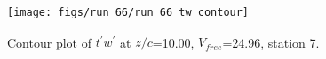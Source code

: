\begin{figure}[H]
\centering
\texttt{[image: figs/run\_66/run\_66\_tw\_contour]}
\caption{Contour plot of $\overline{t^\prime w^\prime}$ at $z/c$=10.00, $V_{free}$=24.96, station 7.}
\label{fig:run_66_tw_contour}
\end{figure}



